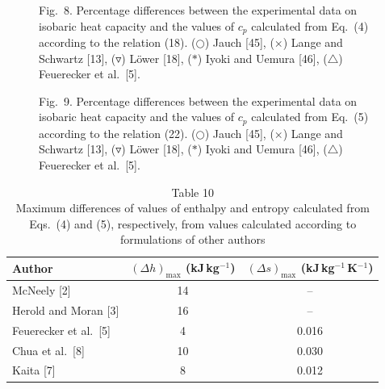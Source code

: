 \documentclass[11pt]{article}
\newcommand{\kJkg}{kJ\,kg$^{-1}$}
\newcommand{\kJkgK}{kJ\,kg$^{-1}$\,K$^{-1}$}
\begin{document}
\begin{figure}[htbp]\centering
\caption*{Fig.~8. Percentage differences between the experimental data
on isobaric heat capacity and the values of $c_p$ calculated from
Eq.~(4) according to the relation (18). ($\bigcirc$) Jauch [45],
($\times$) Lange and Schwartz [13], ($\triangledown$) L\"ower [18],
($*$) Iyoki and Uemura [46], ($\triangle$) Feuerecker et al.\ [5].}
\end{figure}

\begin{figure}[htbp]\centering
\caption*{Fig.~9. Percentage differences between the experimental data
on isobaric heat capacity and the values of $c_p$ calculated from
Eq.~(5) according to the relation (22). ($\bigcirc$) Jauch [45],
($\times$) Lange and Schwartz [13], ($\triangledown$) L\"ower [18],
($*$) Iyoki and Uemura [46], ($\triangle$) Feuerecker et al.\ [5].}
\end{figure}


\begin{table}[htbp]
\centering
\caption*{Table 10\\ Maximum differences of values of enthalpy and
          entropy calculated from Eqs.~(4) and (5), respectively, from
          values calculated according to formulations of other authors}
\begin{tabular}{lcc}
\toprule
Author & $(\Delta h)_\mathrm{max}$ (\kJkg)
       & $(\Delta s)_\mathrm{max}$ (\kJkgK) \\
\midrule
McNeely [2]             & 14 & --    \\
Herold and Moran [3]    & 16 & --    \\
Feuerecker et al.\ [5]  & 4  & 0.016 \\
Chua et al.\ [8]        & 10 & 0.030 \\
Kaita [7]               & 8  & 0.012 \\
\bottomrule
\end{tabular}
\end{table}
\end{document}
